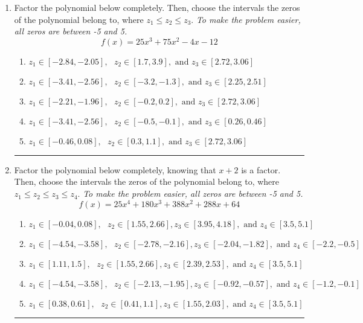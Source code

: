\documentclass[14pt]{extbook}
\newcommand{\litem}[1]{\item#1\hspace*{-1cm}\rule{\textwidth}{0.4pt}}
\begin{document}
\begin{enumerate}
\litem{
Factor the polynomial below completely. Then, choose the intervals the zeros of the polynomial belong to, where $z_1 \leq z_2 \leq z_3$. \textit{To make the problem easier, all zeros are between -5 and 5.}\[ f(x) = 25x^{3} +75 x^{2} -4 x -12 \]\begin{enumerate}[label=\Alph*.]
\item \( z_1 \in [-2.84, -2.05], \text{   }  z_2 \in [1.7, 3.9], \text{   and   } z_3 \in [2.72, 3.06] \)
\item \( z_1 \in [-3.41, -2.56], \text{   }  z_2 \in [-3.2, -1.3], \text{   and   } z_3 \in [2.25, 2.51] \)
\item \( z_1 \in [-2.21, -1.96], \text{   }  z_2 \in [-0.2, 0.2], \text{   and   } z_3 \in [2.72, 3.06] \)
\item \( z_1 \in [-3.41, -2.56], \text{   }  z_2 \in [-0.5, -0.1], \text{   and   } z_3 \in [0.26, 0.46] \)
\item \( z_1 \in [-0.46, 0.08], \text{   }  z_2 \in [0.3, 1.1], \text{   and   } z_3 \in [2.72, 3.06] \)

\end{enumerate} }
\litem{
Factor the polynomial below completely, knowing that $x+2$ is a factor. Then, choose the intervals the zeros of the polynomial belong to, where $z_1 \leq z_2 \leq z_3 \leq z_4$. \textit{To make the problem easier, all zeros are between -5 and 5.}\[ f(x) = 25x^{4} +180 x^{3} +388 x^{2} +288 x + 64 \]\begin{enumerate}[label=\Alph*.]
\item \( z_1 \in [-0.04, 0.08], \text{   }  z_2 \in [1.55, 2.66], z_3 \in [3.95, 4.18], \text{   and   } z_4 \in [3.5, 5.1] \)
\item \( z_1 \in [-4.54, -3.58], \text{   }  z_2 \in [-2.78, -2.16], z_3 \in [-2.04, -1.82], \text{   and   } z_4 \in [-2.2, -0.5] \)
\item \( z_1 \in [1.11, 1.5], \text{   }  z_2 \in [1.55, 2.66], z_3 \in [2.39, 2.53], \text{   and   } z_4 \in [3.5, 5.1] \)
\item \( z_1 \in [-4.54, -3.58], \text{   }  z_2 \in [-2.13, -1.95], z_3 \in [-0.92, -0.57], \text{   and   } z_4 \in [-1.2, -0.1] \)
\item \( z_1 \in [0.38, 0.61], \text{   }  z_2 \in [0.41, 1.1], z_3 \in [1.55, 2.03], \text{   and   } z_4 \in [3.5, 5.1] \)


\end{enumerate}}
\end{enumerate}
\end{document}
